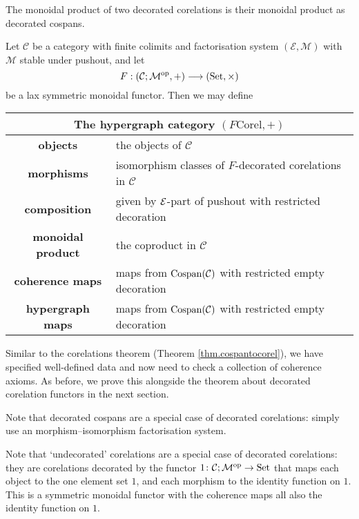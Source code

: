 The monoidal product of two decorated corelations is their monoidal product as
decorated cospans.

\begin{theorem} \label{thm.fcorel}
  Let $\mathcal C$ be a category with finite colimits and factorisation system
  $(\mathcal E, \mathcal M)$ with $\mathcal M$ stable under pushout, and let 
  \[
    F: (\mathcal C;\mathcal M^{\mathrm{op}},+) \longrightarrow (\mathrm{Set}, \times)
  \]
  be a lax symmetric monoidal functor.  Then we may define 
  \smallskip 

  \begin{center}
    \begin{tabular}{| c | p{} |}
      \hline
      \multicolumn{2}{|c|}{The hypergraph category $(F\mathrm{Corel},+)$} \\
      \hline
      \textbf{objects} & the objects of $\mathcal C$ \\ 
      \textbf{morphisms} & isomorphism classes of $F$-decorated corelations in
      $\mathcal C$\\ 
      \textbf{composition} & given by $\mathcal E$-part of pushout with restricted
      decoration  \\
      \textbf{monoidal product} & the coproduct in $\mathcal C$  \\
      \textbf{coherence maps} & maps from $\operatorname{{Cospan}}(\mathcal C)$ with restricted empty
      decoration \\
      \textbf{hypergraph maps} & maps from $\operatorname{{Cospan}}(\mathcal C)$ with restricted empty
      decoration \\
      \hline
    \end{tabular}
  \end{center}
  \smallskip 
\end{theorem}

Similar to the corelations theorem (Theorem \ref{thm.cospantocorel}), we have
specified well-defined data and now need to check a collection of coherence
axioms. As before, we prove this alongside the theorem about decorated
corelation functors in the next section.

\begin{example}
  Note that decorated cospans are a special case of decorated corelations:
  simply use an morphism--isomorphism factorisation system.
\end{example}

\begin{example} \label{ex.undeccorel}
  Note that `undecorated' corelations are a special case of decorated
  corelations: they are corelations decorated by the functor $1{\colon} \mathcal C;\mathcal
  M^{\mathrm{op}} \to \mathrm{Set}$ that maps each object to the one element set $1$, and each
  morphism to the identity function on $1$. This is a symmetric monoidal functor
  with the coherence maps all also the identity function on $1$.
\end{example}


